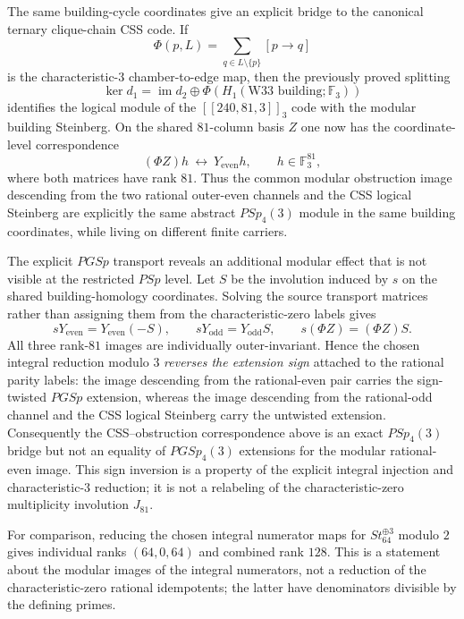 The same building-cycle coordinates give an explicit bridge to the canonical
ternary clique-chain CSS code.  If
\[
\Phi(p,L)=\sum_{q\in L\setminus\{p\}}[p\to q]
\]
is the characteristic-$3$ chamber-to-edge map, then the previously proved
splitting
\[
\ker d_1=\operatorname{im}d_2\oplus \Phi(H_1(\text{W33 building};\mathbb F_3))
\]
identifies the logical module of the $[[240,81,3]]_3$ code with the modular
building Steinberg.  On the shared $81$-column basis $Z$ one now has the
coordinate-level correspondence
\[
(\Phi Z)h\ \longleftrightarrow\ Y_{\mathrm{even}}h,
\qquad h\in\mathbb F_3^{81},
\]
where both matrices have rank $81$.  Thus the common modular obstruction image
descending from the two rational outer-even channels and the CSS logical
Steinberg are explicitly the same abstract $PSp_4(3)$ module in the same
building coordinates, while living on different finite carriers.

The explicit $PGSp$ transport reveals an additional modular effect that is not
visible at the restricted $PSp$ level.  Let $S$ be the involution induced by
$s$ on the shared building-homology coordinates.  Solving the source transport
matrices rather than assigning them from the characteristic-zero labels gives
\[
 sY_{\mathrm{even}}=Y_{\mathrm{even}}(-S),\qquad
 sY_{\mathrm{odd}}=Y_{\mathrm{odd}}S,
 \qquad
 s(\Phi Z)=(\Phi Z)S.
\]
All three rank-$81$ images are individually outer-invariant.  Hence the chosen
integral reduction modulo $3$ \emph{reverses the extension sign} attached to
the rational parity labels: the image descending from the rational-even pair
carries the sign-twisted $PGSp$ extension, whereas the image descending from
the rational-odd channel and the CSS logical Steinberg carry the untwisted
extension.  Consequently the CSS--obstruction correspondence above is an exact
$PSp_4(3)$ bridge but not an equality of $PGSp_4(3)$ extensions for the modular
rational-even image.  This sign inversion is a property of the explicit
integral injection and characteristic-$3$ reduction; it is not a relabeling of
the characteristic-zero multiplicity involution $J_{81}$.

For comparison, reducing the chosen integral numerator maps for
$St_{64}^{\oplus3}$ modulo $2$ gives individual ranks $(64,0,64)$ and combined
rank $128$.  This is a statement about the modular images of the integral
numerators, not a reduction of the characteristic-zero rational idempotents;
the latter have denominators divisible by the defining primes.

